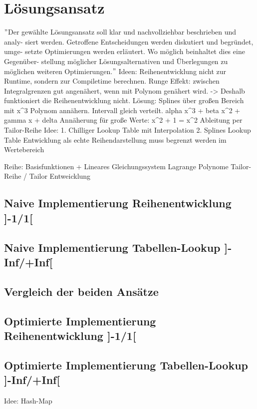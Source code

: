 \documentclass[course=erap]{aspdoc}
\begin{document}
\section{Lösungsansatz}
\("\)Der gewählte Lösungsansatz soll klar und nachvollziehbar beschrieben und analy- siert werden. Getroffene Entscheidungen werden diskutiert und begründet, umge- setzte Optimierungen werden erläutert. Wo möglich beinhaltet dies eine Gegenüber- stellung möglicher Lösungsalternativen und Überlegungen zu möglichen weiteren Optimierungen.\("\)
Ideen: Reihenentwicklung nicht zur Runtime, sondern zur Compiletime berechnen.
Runge Effekt: zwischen Integralgrenzen gut angenähert, wenn mit Polynom genähert wird. -> Deshalb funktioniert die Reihenentwicklung nicht.
Lösung: Splines über großen Bereich mit x^3 Polynom annähern. Intervall gleich verteilt. alpha x^3 + beta x^2 + gamma x + delta
Annäherung für große Werte: x^2 + 1 = x^2
Ableitung per Tailor-Reihe
Idee: 1. Chilliger Lookup Table mit Interpolation 2. Splines Lookup Table
Entwicklung als echte Reihendarstellung muss begrenzt werden im Wertebereich

Reihe: Basisfunktionen + Lineares Gleichungssystem
Lagrange Polynome
Tailor-Reihe / Tailor Entweicklung

\subsection{Naive Implementierung Reihenentwicklung ]-1/1[}

\subsection{Naive Implementierung Tabellen-Lookup ]-Inf/+Inf[}

\subsection{Vergleich der beiden Ansätze}

\subsection{Optimierte Implementierung Reihenentwicklung ]-1/1[}

\subsection{Optimierte Implementierung Tabellen-Lookup ]-Inf/+Inf[}
Idee: Hash-Map
\end{document}
